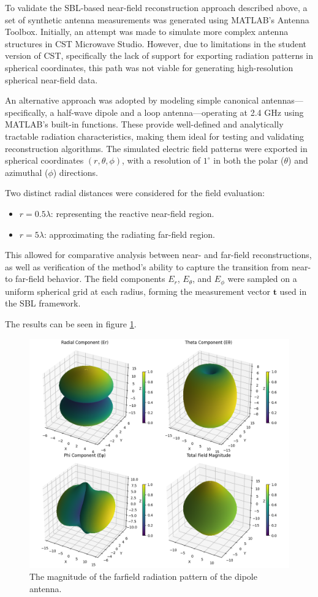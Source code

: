 \documentclass{article}
\begin{document}
To validate the SBL-based near-field reconstruction approach described above, a set of synthetic antenna measurements was generated using MATLAB's Antenna Toolbox. Initially, an attempt was made to simulate more complex antenna structures in CST Microwave Studio. However, due to limitations in the student version of CST, specifically the lack of support for exporting radiation patterns in spherical coordinates, this path was not viable for generating high-resolution spherical near-field data.

An alternative approach was adopted by modeling simple canonical antennas—specifically, a half-wave dipole and a loop antenna—operating at 2.4 GHz using MATLAB’s built-in functions. These provide well-defined and analytically tractable radiation characteristics, making them ideal for testing and validating reconstruction algorithms. The simulated electric field patterns were exported in spherical coordinates $(r, \theta, \phi)$, with a resolution of $1^\circ$ in both the polar ($\theta$) and azimuthal ($\phi$) directions.

Two distinct radial distances were considered for the field evaluation:
\begin{itemize}
    \item $r = 0.5\lambda$: representing the reactive near-field region.
    \item $r = 5\lambda$: approximating the radiating far-field region.
\end{itemize}

This allowed for comparative analysis between near- and far-field reconstructions, as well as verification of the method’s ability to capture the transition from near- to far-field behavior. The field components $E_r$, $E_\theta$, and $E_\phi$ were sampled on a uniform spherical grid at each radius, forming the measurement vector $\mathbf{t}$ used in the SBL framework. 

The results can be seen in figure \ref{fig:dipole_rad}.
\begin{figure}[H]
    \centering
    \includegraphics[width=0.75\linewidth]{Figures/Dipol_radiation.png}
    \caption{The magnitude of the farfield radiation pattern of the dipole antenna.}
    \label{fig:dipole_rad}
\end{figure}
\end{document}
